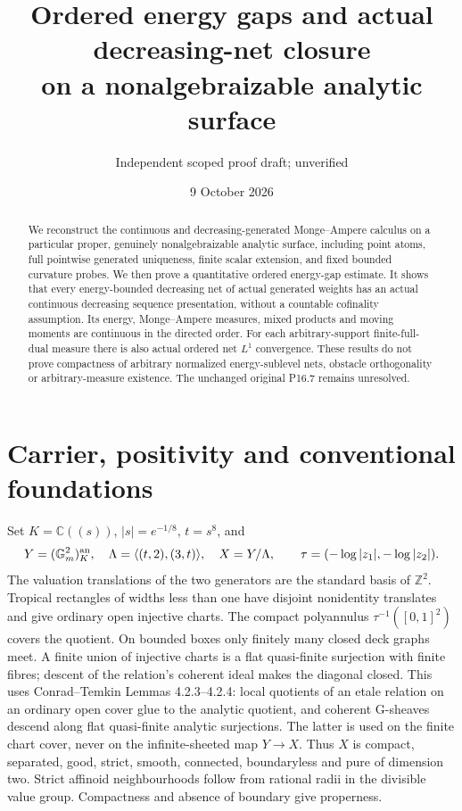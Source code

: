 \documentclass[11pt]{article}
\title{Ordered energy gaps and actual decreasing-net closure\\
on a nonalgebraizable analytic surface}
\author{Independent scoped proof draft; unverified}
\date{9 October 2026}
\theoremstyle{remark}\newtheorem{remark}[theorem]{Remark}
\begin{document}
\maketitle
\begin{abstract}
We reconstruct the continuous and decreasing-generated Monge--Ampere
calculus on a particular proper, genuinely nonalgebraizable analytic
surface, including point atoms, full pointwise generated uniqueness,
finite scalar extension, and fixed bounded curvature probes. We then
prove a quantitative ordered energy-gap estimate. It shows that every
energy-bounded decreasing net of actual generated weights has an actual
continuous decreasing sequence presentation, without a countable
cofinality assumption. Its energy, Monge--Ampere measures, mixed products
and moving moments are continuous in the directed order. For each
arbitrary-support finite-full-dual measure there is also actual ordered
net $L^1$ convergence. These results do not prove compactness of arbitrary
normalized energy-sublevel nets, obstacle orthogonality or arbitrary-measure
existence. The unchanged original P16.7 remains unresolved.
\end{abstract}

\section{Carrier, positivity and conventional foundations}
Set $K=\mathbb C((s))$, $|s|=e^{-1/8}$, $t=s^8$, and
\[
Y=(\mathbb G_m^2)^{\rm an}_K,\quad
\Lambda=\langle(t,2),(3,t)\rangle,\quad X=Y/\Lambda,
\qquad \tau=(-\log|z_1|,-\log|z_2|).
\]
The valuation translations of the two generators are the standard basis
of $\mathbb Z^2$. Tropical rectangles of widths less than one have
disjoint nonidentity translates and give ordinary open injective charts.
The compact polyannulus $\tau^{-1}([0,1]^2)$ covers the quotient.
On bounded boxes only finitely many closed deck graphs meet. A finite
union of injective charts is a flat quasi-finite surjection with finite
fibres; descent of the relation's coherent ideal makes the diagonal
closed. This uses Conrad--Temkin Lemmas 4.2.3--4.2.4: local quotients of
an etale relation on an ordinary open cover glue to the analytic quotient,
and coherent G-sheaves descend along flat quasi-finite analytic
surjections. The latter is used on the finite chart cover, never on the
infinite-sheeted map $Y\to X$. Thus $X$ is compact, separated, good,
strict, smooth, connected, boundaryless and pure of dimension two.
Strict affinoid neighbourhoods follow from rational radii in the divisible
value group. Compactness and absence of boundary give properness.
\end{document}
